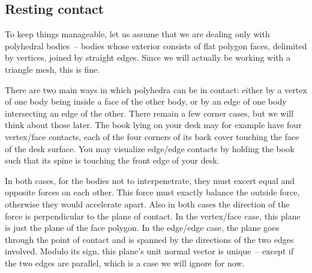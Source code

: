 \subsection{Resting contact}

To keep things manageable, let us assume that we are dealing only with polyhedral bodies~-- bodies
whose exterior consists of flat polygon faces, delimited by vertices, joined by straight edges.
Since we will actually be working with a triangle mesh, this is fine.

There are two main ways in which polyhedra can be in contact: either by a vertex of one body being
inside a face of the other body, or by an edge of one body intersecting an edge of the other.
There remain a few corner cases, but we will think about those later. The book lying on your desk
may for example have four vertex/face contacts, each of the four corners of its back cover
touching the face of the desk surface. You may visualize edge/edge contacts by holding the book
such that its spine is touching the front edge of your desk.

In both cases, for the bodies not to interpenetrate, they must excert equal and opposite forces on
each other. This force must exactly balance the outside force, otherwise they would accelerate
apart. Also in both cases the direction of the force is perpendicular to the plane of contact. In
the vertex/face case, this plane is just the plane of the face polygon. In the edge/edge case, the
plane goes through the point of contact and is spanned by the directions of the two edges involved.
Modulo its sign, this plane's unit normal vector is unique~-- except if the two edges are
parallel, which is a case we will ignore for now.


